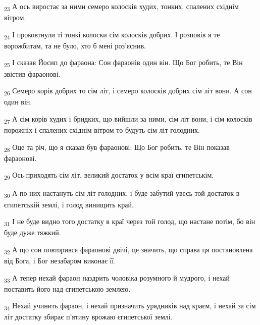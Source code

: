 \begin{tcolorbox}
\textsubscript{23} А ось виростає за ними семеро колосків худих, тонких, спалених східнім вітром.
\end{tcolorbox}
\begin{tcolorbox}
\textsubscript{24} І проковтнули ті тонкі колоски сім колосків добрих. І розповів я те ворожбитам, та не було, хто б мені роз'яснив.
\end{tcolorbox}
\begin{tcolorbox}
\textsubscript{25} І сказав Йосип до фараона: Сон фараонів один він. Що Бог робить, те Він звістив фараонові.
\end{tcolorbox}
\begin{tcolorbox}
\textsubscript{26} Семеро корів добрих то сім літ, і семеро колосків добрих сім літ вони. А сон один він.
\end{tcolorbox}
\begin{tcolorbox}
\textsubscript{27} А сім корів худих і бридких, що вийшли за ними, сім літ вони, і сім колосків порожніх і спалених східнім вітром то будуть сім літ голодних.
\end{tcolorbox}
\begin{tcolorbox}
\textsubscript{28} Оце та річ, що я сказав був фараонові: Що Бог робить, те Він показав фараонові.
\end{tcolorbox}
\begin{tcolorbox}
\textsubscript{29} Ось приходять сім літ, великий достаток у всім краї єгипетськім.
\end{tcolorbox}
\begin{tcolorbox}
\textsubscript{30} А по них настануть сім літ голодних, і буде забутий увесь той достаток в єгипетській землі, і голод винищить край.
\end{tcolorbox}
\begin{tcolorbox}
\textsubscript{31} І не буде видно того достатку в краї через той голод, що настане потім, бо він буде дуже тяжкий.
\end{tcolorbox}
\begin{tcolorbox}
\textsubscript{32} А що сон повторився фараонові двічі, це значить, що справа ця постановлена від Бога, і Бог незабаром виконає її.
\end{tcolorbox}
\begin{tcolorbox}
\textsubscript{33} А тепер нехай фараон наздрить чоловіка розумного й мудрого, і нехай поставить його над єгипетською землею.
\end{tcolorbox}
\begin{tcolorbox}
\textsubscript{34} Нехай учинить фараон, і нехай призначить урядників над краєм, і нехай за сім літ достатку збирає п'ятину врожаю єгипетської землі.
\end{tcolorbox}
